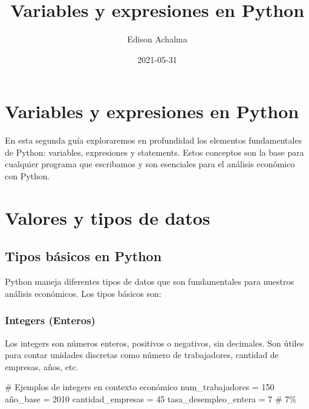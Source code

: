 \documentclass[
  doc,
  floatsintext,
  longtable,
  a4paper,
  nolmodern,
  notxfonts,
  notimes,
  12pt,
  colorlinks=true,linkcolor=blue,citecolor=blue,urlcolor=blue]{apa7}
\title{Variables y expresiones en Python}
\author{Edison Achalma}
\affiliation{
{Escuela Profesional de Economía, Universidad Nacional de San Cristóbal
de Huamanga}}
\date{2021-05-31}
\newenvironment{Shaded}{\begin{snugshade}}{\end{snugshade}}
\newcommand{\CommentTok}[1]{\textcolor[rgb]{0.37,0.37,0.37}{#1}}
\newcommand{\DecValTok}[1]{\textcolor[rgb]{0.68,0.00,0.00}{#1}}
\newcommand{\NormalTok}[1]{\textcolor[rgb]{0.00,0.23,0.31}{#1}}
\newcommand{\OperatorTok}[1]{\textcolor[rgb]{0.37,0.37,0.37}{#1}}
\begin{document}
\maketitle


\hypertarget{toc}{}
\tableofcontents
\newpage
\section[Introduction]{Variables y expresiones en Python}

\setcounter{secnumdepth}{3}

\setlength\LTleft{0pt}




En esta segunda guía exploraremos en profundidad los elementos
fundamentales de Python: variables, expresiones y statements. Estos
conceptos son la base para cualquier programa que escribamos y son
esenciales para el análisis económico con Python.

\section{Valores y tipos de datos}\label{valores-y-tipos-de-datos}

\subsection{Tipos básicos en Python}\label{tipos-buxe1sicos-en-python}

Python maneja diferentes tipos de datos que son fundamentales para
nuestros análisis económicos. Los tipos básicos son:

\subsubsection{Integers (Enteros)}\label{integers-enteros}

Los integers son números enteros, positivos o negativos, sin decimales.
Son útiles para contar unidades discretas como número de trabajadores,
cantidad de empresas, años, etc.

\begin{Shaded}
\begin{Highlighting}[]
\CommentTok{\# Ejemplos de integers en contexto económico}
\NormalTok{num\_trabajadores }\OperatorTok{=} \DecValTok{150}
\NormalTok{año\_base }\OperatorTok{=} \DecValTok{2010}
\NormalTok{cantidad\_empresas }\OperatorTok{=} \DecValTok{45}
\NormalTok{tasa\_desempleo\_entera }\OperatorTok{=} \DecValTok{7}  \CommentTok{\# 7\%}
\end{Highlighting}
\end{Shaded}
\end{document}
